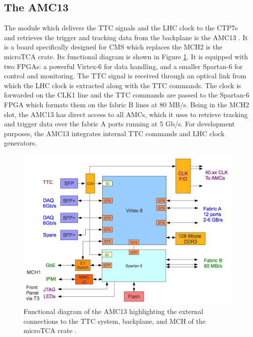     \subsection{The AMC13}

      The module which delivers the TTC signals and the LHC clock to the CTP7s and retrieves the trigger and tracking data from the backplane is the AMC13 \cite{AMC13}. It is a board specifically designed for CMS which replaces the MCH2 is the microTCA crate. Its functional diagram is shown in Figure \ref{fig:II-2-amc13}. It is equipped with two FPGAs: a powerful Virtex-6 for data handling, and a smaller Spartan-6 for control and monitoring. The TTC signal is received through an optical link from which the LHC clock is extracted along with the TTC commands. The clock is forwarded on the CLK1 line and the TTC commands are passed to the Spartan-6 FPGA which formats them on the fabric B lines at 80 MB/s. Being in the MCH2 slot, the AMC13 has direct access to all AMCs, which it uses to retrieve tracking and trigger data over the fabric A ports running at 5 Gb/s. For development purposes, the AMC13 integrates internal TTC commands and LHC clock generators. \\

      \begin{figure}[h!]
        \centering
        \includegraphics[width=\textwidth]{img/II-2-daq/amc13.png}
        \caption{Functional diagram of the AMC13 highlighting the external connections to the TTC system, backplane, and MCH of the microTCA crate \cite{AMC13}.}
        \label{fig:II-2-amc13}
      \end{figure}

